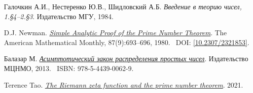 \thispagestyle{supplementary}

\begin{thebibliography}{4}
        Галочкин А.И., Нестеренко Ю.В., Шидловский А.Б. 
        \textit{Введение в теорию чисел, 1.\S4--2.\S3}. 
        Издательство МГУ, 1984.

        D.J. Newman. 
        \href{https://www.math.stonybrook.edu/~moira/mat331-spr10/papers/1980%20NewmanSimple%20Analytic%20Proof%20of%20the.pdf}{\textit{Simple Analytic Proof of the Prime Number Theorem}}. 
        The American Mathematical Monthly, 87(9):693--696, 1980.~\newline
        DOI: \href{https://doi.org/10.2307/2321853}{[10.2307/2321853]}.

        Балазар М. 
        \href{https://www.mccme.ru/free-books/dubna/balazard.pdf}{\textit{Асимптотический закон распределения простых чисел}}. 
        Издательство МЦНМО, 2013.~\newline
        ISBN: 978-5-4439-0062-9.

        Terence Tao. 
        \href{https://terrytao.wordpress.com/2021/02/12/246b-notes-4-the-riemann-zeta-function-and-the-prime-number-theorem/}{\textit{The Riemann zeta function and the prime number theorem}}. 
        2021.
\end{thebibliography}
